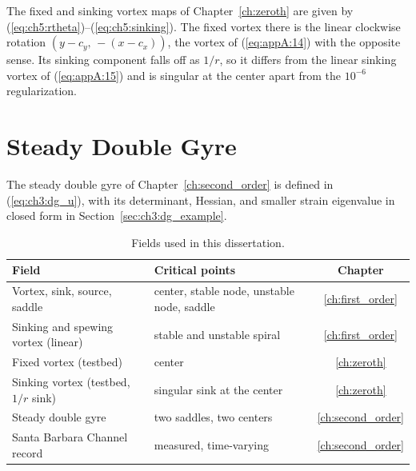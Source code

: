 The fixed and sinking vortex maps of Chapter~\ref{ch:zeroth} are given by
(\ref{eq:ch5:rtheta})--(\ref{eq:ch5:sinking}). The fixed vortex there is
the linear clockwise rotation $(y - c_y,\, -(x - c_x))$, the vortex of
(\ref{eq:appA:14}) with the opposite sense. Its sinking component falls
off as $1/r$, so it differs from the linear sinking vortex of
(\ref{eq:appA:15}) and is singular at the center apart from the
$10^{-6}$ regularization.

\section{Steady Double Gyre}
\label{sec:appA:dg}

The steady double gyre of Chapter~\ref{ch:second_order} is defined in
(\ref{eq:ch3:dg_u}), with its determinant, Hessian, and smaller strain
eigenvalue in closed form in Section~\ref{sec:ch3:dg_example}.

\begin{table}[htbp]
\centering
\caption{Fields used in this dissertation.}
\label{tab:appA:summary}
\begin{tabular}{>{\raggedright\arraybackslash}p{5.2cm} >{\raggedright\arraybackslash}p{5.2cm} c}
\hline
Field & Critical points & Chapter \\
\hline
Vortex, sink, source, saddle & center, stable node, unstable node, saddle & \ref{ch:first_order} \\
Sinking and spewing vortex (linear) & stable and unstable spiral & \ref{ch:first_order} \\
Fixed vortex (testbed) & center & \ref{ch:zeroth} \\
Sinking vortex (testbed, $1/r$ sink) & singular sink at the center & \ref{ch:zeroth} \\
Steady double gyre & two saddles, two centers & \ref{ch:second_order} \\
Santa Barbara Channel record & measured, time-varying & \ref{ch:second_order} \\
\hline
\end{tabular}
\end{table}
